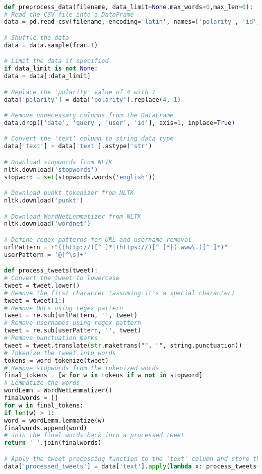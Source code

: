 \begin{lstlisting}[language=Python, caption=Preprocess of Tweets]

def preprocess_data(filename, data_limit=None,max_words=0,max_len=0):
# Read the CSV file into a DataFrame
data = pd.read_csv(filename, encoding='latin', names=['polarity', 'id', 'date', 'query', 'user', 'text'])

# Shuffle the data
data = data.sample(frac=1)

# Limit the data if specified
if data_limit is not None:
data = data[:data_limit]

# Replace the 'polarity' value of 4 with 1
data['polarity'] = data['polarity'].replace(4, 1)

# Remove unnecessary columns from the DataFrame
data.drop(['date', 'query', 'user', 'id'], axis=1, inplace=True)

# Convert the 'text' column to string data type
data['text'] = data['text'].astype('str')

# Download stopwords from NLTK
nltk.download('stopwords')
stopword = set(stopwords.words('english'))

# Download punkt tokenizer from NLTK
nltk.download('punkt')

# Download WordNetLemmatizer from NLTK
nltk.download('wordnet')

# Define regex patterns for URL and username removal
urlPattern = r"((http://)[^ ]*|(https://)[^ ]*|( www\.)[^ ]*)"
userPattern = '@[^\s]+'

def process_tweets(tweet):
# Convert the tweet to lowercase
tweet = tweet.lower()
# Remove the first character (assuming it's a special character)
tweet = tweet[1:]
# Remove URLs using regex pattern
tweet = re.sub(urlPattern, '', tweet)
# Remove usernames using regex pattern
tweet = re.sub(userPattern, '', tweet)
# Remove punctuation marks
tweet = tweet.translate(str.maketrans("", "", string.punctuation))
# Tokenize the tweet into words
tokens = word_tokenize(tweet)
# Remove stopwords from the tokenized words
final_tokens = [w for w in tokens if w not in stopword]
# Lemmatize the words
wordLemm = WordNetLemmatizer()
finalwords = []
for w in final_tokens:
if len(w) > 1:
word = wordLemm.lemmatize(w)
finalwords.append(word)
# Join the final words back into a processed tweet
return ' '.join(finalwords)

# Apply the tweet processing function to the 'text' column and store the processed tweets in a new column 'processed_tweets'
data['processed_tweets'] = data['text'].apply(lambda x: process_tweets(x))



\end{lstlisting}
